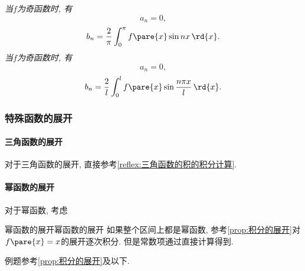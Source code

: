 \documentclass[hidelinks]{ctexart}
\begin{document}
\begin{finale}
\begin{multicols}{2}
    \textit{当$f$为奇函数时, 有}
    \[ a_n = 0, \]
    \[ b_n = \frac{2}{\pi} \int_{0}^\pi f\pare{x}\sin nx\,\rd{x}. \]
    \textit{当$f$为奇函数时, 有}
    \[ a_n = 0, \]
    \[ b_n = \frac{2}{l} \int_{0}^l f\pare{x}\sin \frac{n\pi x}{l}\,\rd{x}. \]
\end{multicols}
\end{finale}



\subsubsection{特殊函数的展开} %
\label{ssub:特殊函数的展开}

\paragraph{三角函数的展开} %
\label{par:三角函数的展开}
 
对于三角函数的展开, 直接参考\cref{reflex:三角函数的积的积分计算}.


 \paragraph{幂函数的展开} %
 \label{par:幂函数的展开}

 对于幂函数, 考虑
\begin{reflex}{幂函数的展开}{幂函数的展开}
    如果整个区间上都是幂函数, 参考\cref{prop:积分的展开}对$f\pare{x}=x$的展开逐次积分. 但是常数项通过直接计算得到.
\end{reflex}
例题参考\cref{prop:积分的展开}及以下.
\end{document}
